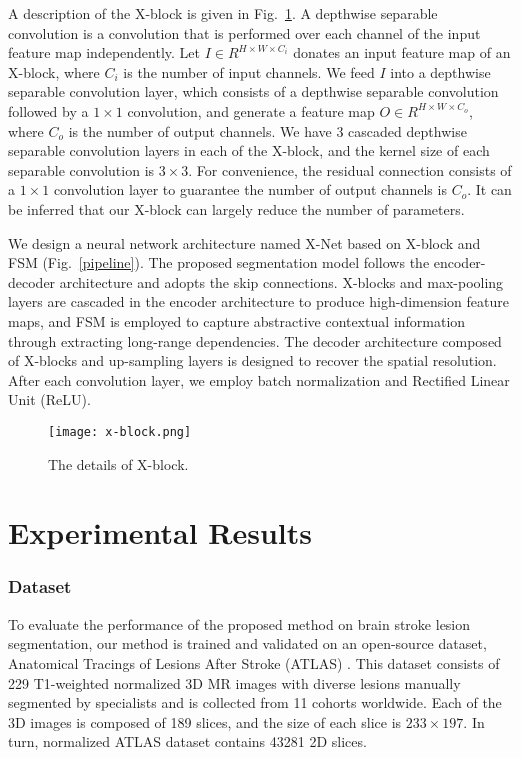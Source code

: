 \documentclass[runningheads]{llncs}
\begin{document}
A description of the X-block is given in Fig.~\ref{x-block}. A depthwise separable convolution is a convolution that is performed over each channel of the input feature map independently. Let $I\in R^{H\times W\times C_i}$ donates an input feature map of an X-block, where $C_i$ is the number of input channels. We feed $I$ into a depthwise separable convolution layer, which consists of a depthwise separable convolution followed by a $1 \times 1$ convolution, and generate a feature map $O \in R^{H\times W\times C_o}$, where $C_o$ is the number of output channels. We have 3 cascaded depthwise separable convolution layers in each of the X-block, and the kernel size of each separable convolution is $3\times 3$. For convenience, the residual connection consists of a $1 \times 1$ convolution layer to guarantee the number of output channels is $C_o$. It can be inferred that our X-block can largely reduce the number of parameters.

We design a neural network architecture named X-Net based on X-block and FSM (Fig.~\ref{pipeline}). The proposed segmentation model follows the encoder-decoder architecture and adopts the skip connections. X-blocks and max-pooling layers are cascaded in the encoder architecture to produce high-dimension feature maps, and FSM is employed to capture abstractive contextual information through extracting long-range dependencies. The decoder architecture composed of X-blocks and up-sampling layers is designed to recover the spatial resolution. After each convolution layer, we employ batch normalization and Rectified Linear Unit (ReLU).

\begin{figure}
	\texttt{[image: x-block.png]}
	\caption{The details of X-block.} \label{x-block}
\end{figure}


\section{Experimental Results}
\subsubsection{Dataset}
To evaluate the performance of the proposed method on brain stroke lesion segmentation, our method is trained and validated on an open-source dataset, Anatomical Tracings of Lesions After Stroke (ATLAS) \cite{[2]}. This dataset consists of 229 T1-weighted normalized 3D MR images with diverse lesions manually segmented by specialists and is collected from 11 cohorts worldwide. Each of the 3D images is composed of 189 slices, and the size of each slice is $233\times 197$. In turn, normalized ATLAS dataset contains 43281 2D slices.
\end{document}
